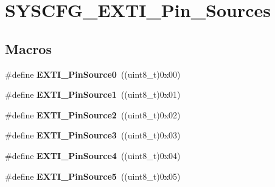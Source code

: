\hypertarget{group___s_y_s_c_f_g___e_x_t_i___pin___sources}{\section{S\-Y\-S\-C\-F\-G\-\_\-\-E\-X\-T\-I\-\_\-\-Pin\-\_\-\-Sources}
\label{group___s_y_s_c_f_g___e_x_t_i___pin___sources}
}
\subsection*{Macros}
\begin{DoxyCompactItemize}
\item 
\hypertarget{group___s_y_s_c_f_g___e_x_t_i___pin___sources_ga85e9f2bccca02c8f63fa5d486bb42393}{\#define {\bfseries E\-X\-T\-I\-\_\-\-Pin\-Source0}~((uint8\-\_\-t)0x00)}\label{group___s_y_s_c_f_g___e_x_t_i___pin___sources_ga85e9f2bccca02c8f63fa5d486bb42393}

\item 
\hypertarget{group___s_y_s_c_f_g___e_x_t_i___pin___sources_gadc4c0152b4bd194f872061c03cc9f5d5}{\#define {\bfseries E\-X\-T\-I\-\_\-\-Pin\-Source1}~((uint8\-\_\-t)0x01)}\label{group___s_y_s_c_f_g___e_x_t_i___pin___sources_gadc4c0152b4bd194f872061c03cc9f5d5}

\item 
\hypertarget{group___s_y_s_c_f_g___e_x_t_i___pin___sources_ga6306a0c8e41b63c45387146670e63fbd}{\#define {\bfseries E\-X\-T\-I\-\_\-\-Pin\-Source2}~((uint8\-\_\-t)0x02)}\label{group___s_y_s_c_f_g___e_x_t_i___pin___sources_ga6306a0c8e41b63c45387146670e63fbd}

\item 
\hypertarget{group___s_y_s_c_f_g___e_x_t_i___pin___sources_ga3c1315cbd350e6da814124d523657202}{\#define {\bfseries E\-X\-T\-I\-\_\-\-Pin\-Source3}~((uint8\-\_\-t)0x03)}\label{group___s_y_s_c_f_g___e_x_t_i___pin___sources_ga3c1315cbd350e6da814124d523657202}

\item 
\hypertarget{group___s_y_s_c_f_g___e_x_t_i___pin___sources_gad540175ce80056822bd017d03fe64bb7}{\#define {\bfseries E\-X\-T\-I\-\_\-\-Pin\-Source4}~((uint8\-\_\-t)0x04)}\label{group___s_y_s_c_f_g___e_x_t_i___pin___sources_gad540175ce80056822bd017d03fe64bb7}

\item 
\hypertarget{group___s_y_s_c_f_g___e_x_t_i___pin___sources_ga95d0ef8a0d250cf48ca1fa7d9787f362}{\#define {\bfseries E\-X\-T\-I\-\_\-\-Pin\-Source5}~((uint8\-\_\-t)0x05)}\label{group___s_y_s_c_f_g___e_x_t_i___pin___sources_ga95d0ef8a0d250cf48ca1fa7d9787f362}


\end{DoxyCompactItemize}
